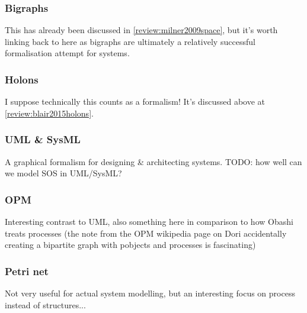 \subsubsection{Bigraphs}

This has already been discussed in \ref{review:milner2009space}, but it's worth
linking back to here as bigraphs are ultimately a relatively successful
formalisation attempt for systems.

\subsubsection{Holons}  %
I suppose technically this counts as a formalism! It's discussed above at \ref{review:blair2015holons}.

\subsubsection{UML \& SysML}  %

A graphical formalism for designing \& architecting systems. TODO: how well can
we model SOS in  UML/SysML?

\subsubsection{OPM}   

Interesting contrast to UML, also something here in
comparison to how Obashi treats processes (the note from                        
the OPM wikipedia page on Dori accidentally creating a                          
bipartite graph with pobjects and processes is fascinating)                     


\subsubsection{Petri net}

Not very useful for actual system modelling, but
an interesting focus on process instead of
structures...
